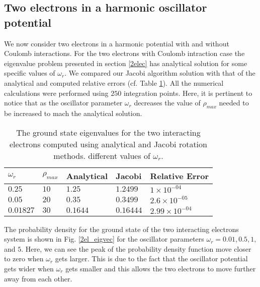 \documentclass[a4paper]{article}
\begin{document}
\subsection{Two electrons in a harmonic oscillator potential}
We now consider two electrons in a harmonic potential with and without Coulomb interactions. For the two electrons with Coulomb intraction case the eigenvalue problem presented in section \ref{2elec} has analytical solution \cite{PhysRevA.48.3561} for some specific values of $\omega_r$. We compared our Jacobi algorithm solution with that of the analytical and computed relative errors (cf. Table \ref{table:eigenvalues}). All the numerical calculations were performed using $250$ integration points. Here, it is pertinent to notice that as the oscillator parameter $\omega_r$ decreases the value of $\rho_{max}$ needed to be increased to mach the analytical solution.

\begin{table}[H]
\caption{The ground state eigenvalues for the two interacting electrons computed using analytical and Jacobi rotation methods. different values of $\omega_r$.\\}
\begin{center}
  \begin{tabular}{|l | l |l |l |l| }
  \hline
    $\omega_r$  & $\rho_{max}$ & Analytical & Jacobi & Relative Error  \\[0.10cm]\hline\hline
     $0.25$     & $10$ & $1.25$     & $1.2499$  & $1\times10^{-04}$\\[0.10cm]
     $0.05$     & $20$ & $0.35$     & $0.3499$  & $2.6\times10^{-05}$\\[0.10cm]
     $0.01827$  & $30$ & $0.1644$   & $0.16444$ &$2.99\times10^{-04}$\\[0.10cm]
     
     \hline
  \end{tabular}
     \label{table:eigenvalues}
\end{center}
\end{table}

The probability density for the ground state of the two interacting electrons system is shown in Fig. \ref{2el_eigvec} for the oscillator parameters $\omega_r = 0.01, 0.5, 1,$ and $5$. Here, we can see the peak of the probability density function move closer to zero when $\omega_r$ gets larger. This is due to the fact that the oscillator potential gets wider when $\omega_r$ gets smaller and this allows the two electrons to move further away from each other.
\end{document}
